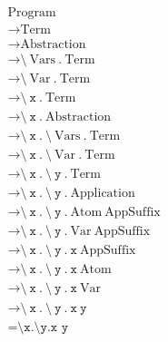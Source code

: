 \documentclass{article}
\begin{document}
\begin{align*}
&\text{Program} \\
&\rightarrow \text{Term} \\
&\rightarrow \text{Abstraction} \\
&\rightarrow \texttt{\textbackslash}\ \text{Vars}\ \texttt{.}\ \text{Term} \\
&\rightarrow \texttt{\textbackslash}\ \text{Var}\ \texttt{.}\ \text{Term} \\
&\rightarrow \texttt{\textbackslash}\ \texttt{x}\ \texttt{.}\ \text{Term} \\
&\rightarrow \texttt{\textbackslash}\ \texttt{x}\ \texttt{.}\ \text{Abstraction} \\
&\rightarrow \texttt{\textbackslash}\ \texttt{x}\ \texttt{.}\ \texttt{\textbackslash}\ \text{Vars}\ \texttt{.}\ \text{Term} \\
&\rightarrow \texttt{\textbackslash}\ \texttt{x}\ \texttt{.}\ \texttt{\textbackslash}\ \text{Var}\ \texttt{.}\ \text{Term} \\
&\rightarrow \texttt{\textbackslash}\ \texttt{x}\ \texttt{.}\ \texttt{\textbackslash}\ \texttt{y}\ \texttt{.}\ \text{Term} \\
&\rightarrow \texttt{\textbackslash}\ \texttt{x}\ \texttt{.}\ \texttt{\textbackslash}\ \texttt{y}\ \texttt{.}\ \text{Application} \\
&\rightarrow \texttt{\textbackslash}\ \texttt{x}\ \texttt{.}\ \texttt{\textbackslash}\ \texttt{y}\ \texttt{.}\ \text{Atom}\ \text{AppSuffix} \\
&\rightarrow \texttt{\textbackslash}\ \texttt{x}\ \texttt{.}\ \texttt{\textbackslash}\ \texttt{y}\ \texttt{.}\ \text{Var}\ \text{AppSuffix} \\
&\rightarrow \texttt{\textbackslash}\ \texttt{x}\ \texttt{.}\ \texttt{\textbackslash}\ \texttt{y}\ \texttt{.}\ \texttt{x}\ \text{AppSuffix} \\
&\rightarrow \texttt{\textbackslash}\ \texttt{x}\ \texttt{.}\ \texttt{\textbackslash}\ \texttt{y}\ \texttt{.}\ \texttt{x}\ \text{Atom} \\
&\rightarrow \texttt{\textbackslash}\ \texttt{x}\ \texttt{.}\ \texttt{\textbackslash}\ \texttt{y}\ \texttt{.}\ \texttt{x}\ \text{Var} \\
&\rightarrow \texttt{\textbackslash}\ \texttt{x}\ \texttt{.}\ \texttt{\textbackslash}\ \texttt{y}\ \texttt{.}\ \texttt{x}\ \texttt{y} \\
&= \texttt{\textbackslash x.\textbackslash y.x y}
\end{align*}
\end{document}
